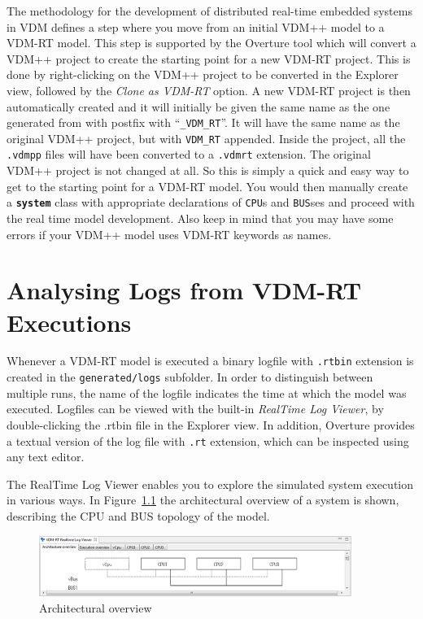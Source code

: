 \documentclass{overturerepchap}
\begin{document}
The methodology for the development of distributed real-time
embedded systems in VDM defines a step where you
move from an initial VDM++ model to a VDM-RT model\cite{Larsen&09b}. This
step is supported by the Overture tool which will convert
a VDM++ project to create the starting point for a new VDM-RT
project. This is done by right-clicking on the VDM++ project to be
converted in the Explorer view, followed by
the \emph{Clone as VDM-RT} option. A new VDM-RT project is then automatically
created and it will initially be given the same name as the one generated from 
with postfix with ``\texttt{\_VDM\_RT}''. It will have the
same name as the original VDM++ project, but with \texttt{VDM\_RT} appended.
Inside the project, all the \texttt{.vdmpp} files will have been converted
to a \texttt{.vdmrt} extension. The original VDM++ project is not
changed at all. So this is simply a quick and easy way to get to the
starting point for a VDM-RT model. You would then manually create
a {\textbf\texttt{system}} class with appropriate declarations of
\texttt{CPU}s and \texttt{BUS}ses and proceed with the real time
model development. Also keep in mind that you may have some errors
if your VDM++ model uses VDM-RT keywords as names.

\chapter{Analysing Logs from VDM-RT Executions}\label{sec:showlog}

Whenever a VDM-RT model is executed a binary logfile with \texttt{.rtbin} extension
is created in the \texttt{generated/logs} subfolder. In order to distinguish between multiple runs,
the name of the logfile indicates the time at which the model was executed. Logfiles can be
viewed with the built-in \emph{RealTime Log Viewer},
by double-clicking the .rtbin file in the Explorer view. In addition, Overture provides
a textual version of the log file with \texttt{.rt} extension,
which can be inspected using any text editor.

The RealTime Log Viewer enables
you to explore the simulated system execution in various ways. In
Figure~\ref{fig:userguide:ArchitecturalOverview} the architectural
overview of a system is shown, describing the CPU and BUS topology of
the model.

\begin{figure}[htp]
\begin{center}
  \includegraphics[width=4in]{figures/ArchitectureOverview}
  \caption{Architectural overview}
  \label{fig:userguide:ArchitecturalOverview}
\end{center}
\end{figure}
\end{document}

